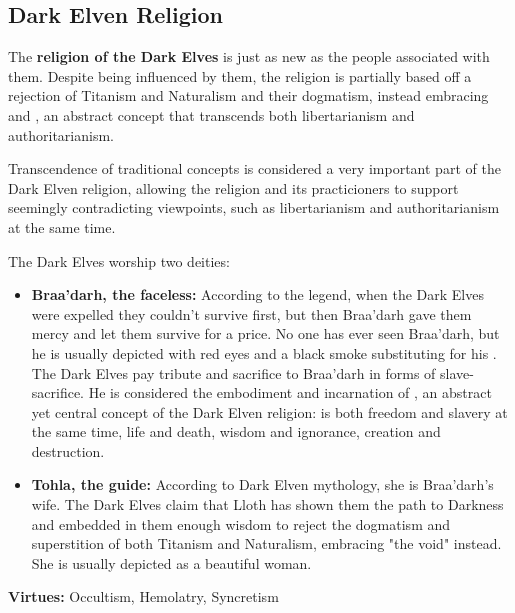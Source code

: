 \subsection{Dark Elven Religion}


The \textbf{religion of the Dark Elves} is just as new as the people associated with them. Despite being influenced by them, the religion is partially based off a rejection of Titanism and Naturalism and their dogmatism, instead embracing  and , an abstract concept that transcends both libertarianism and authoritarianism.

Transcendence of traditional concepts is considered a very important part of the Dark Elven religion, allowing the religion and its practicioners to support seemingly contradicting viewpoints, such as libertarianism  and authoritarianism  at the same time. 

The Dark Elves worship two deities:
\begin{itemize}
  \item \textbf{Braa'darh, the faceless:} According to the legend, when the Dark Elves were expelled they couldn’t survive first, but then Braa'darh gave them mercy and let them survive for a price. No one has ever seen Braa'darh, but he is usually depicted with red eyes and a black smoke substituting for his . The Dark Elves pay tribute and sacrifice to Braa'darh in forms of slave-sacrifice. He is considered the embodiment and incarnation of , an abstract yet central concept of the Dark Elven religion:  is both freedom and slavery at the same time, life and death, wisdom and ignorance, creation and destruction. 
  \item \textbf{Tohla, the guide:} According to Dark Elven mythology, she is Braa'darh's wife. The Dark Elves claim that Lloth has shown them the path to Darkness and embedded in them enough wisdom to reject the dogmatism and superstition of both Titanism and Naturalism, embracing "the void" instead. She is usually depicted as a beautiful woman.
\end{itemize}

\textbf{Virtues:} Occultism, Hemolatry, Syncretism

